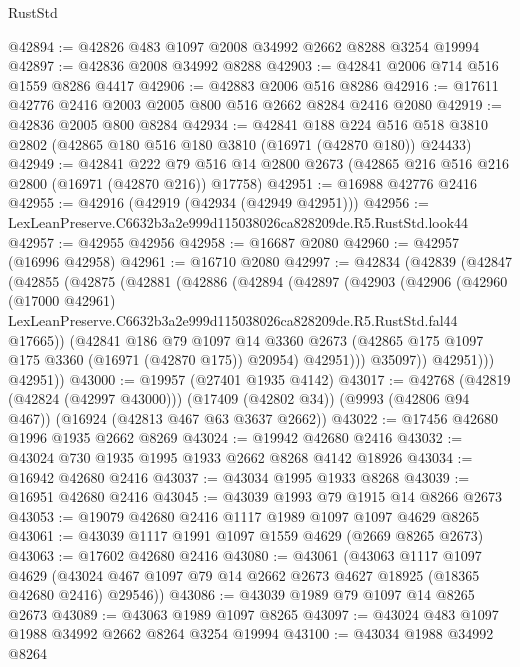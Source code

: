 \begin{lexlean}{RustStd}
\begin{coremodule}
@42894 := @42826 @483 @1097 @2008 @34992 @2662 @8288 @3254 @19994
@42897 := @42836 @2008 @34992 @8288
@42903 := @42841 @2006 @714 @516 @1559 @8286 @4417
@42906 := @42883 @2006 @516 @8286
@42916 := @17611 @42776 @2416 @2003 @2005 @800 @516 @2662 @8284 @2416 @2080
@42919 := @42836 @2005 @800 @8284
@42934 := @42841
    @188
    @224
    @516
    @518
    @3810
    @2802
    (@42865 @180 @516 @180 @3810 (@16971 (@42870 @180)) @24433)
@42949 := @42841
    @222
    @79
    @516
    @14
    @2800
    @2673
    (@42865 @216 @516 @216 @2800 (@16971 (@42870 @216)) @17758)
@42951 := @16988 @42776 @2416
@42955 := @42916 (@42919 (@42934 (@42949 @42951)))
@42956 := LexLeanPreserve.C6632b3a2e999d115038026ca828209de.R5.RustStd.look44
@42957 := @42955 @42956
@42958 := @16687 @2080
@42960 := @42957 (@16996 @42958)
@42961 := @16710 @2080
@42997 := @42834
    (@42839
      (@42847
        (@42855
          (@42875
            (@42881
              (@42886
                (@42894
                  (@42897
                    (@42903
                      (@42906
                        (@42960
                          (@17000 @42961)
                          LexLeanPreserve.C6632b3a2e999d115038026ca828209de.R5.RustStd.fal44
                          @17665))
                      (@42841
                        @186
                        @79
                        @1097
                        @14
                        @3360
                        @2673
                        (@42865 @175 @1097 @175 @3360 (@16971 (@42870 @175)) @20954)
                        @42951)))
                  @35097))
              @42951)))
        @42951))
@43000 := @19957 (@27401 @1935 @4142)
@43017 := @42768
    (@42819 (@42824 (@42997 @43000)))
    (@17409 (@42802 @34))
    (@9993 (@42806 @94 @467))
    (@16924 (@42813 @467 @63 @3637 @2662))
@43022 := @17456 @42680 @1996 @1935 @2662 @8269
@43024 := @19942 @42680 @2416
@43032 := @43024 @730 @1935 @1995 @1933 @2662 @8268 @4142 @18926
@43034 := @16942 @42680 @2416
@43037 := @43034 @1995 @1933 @8268
@43039 := @16951 @42680 @2416
@43045 := @43039 @1993 @79 @1915 @14 @8266 @2673
@43053 := @19079 @42680 @2416 @1117 @1989 @1097 @1097 @4629 @8265
@43061 := @43039 @1117 @1991 @1097 @1559 @4629 (@2669 @8265 @2673)
@43063 := @17602 @42680 @2416
@43080 := @43061
    (@43063
      @1117
      @1097
      @4629
      (@43024 @467 @1097 @79 @14 @2662 @2673 @4627 @18925 (@18365 @42680 @2416) @29546))
@43086 := @43039 @1989 @79 @1097 @14 @8265 @2673
@43089 := @43063 @1989 @1097 @8265
@43097 := @43024 @483 @1097 @1988 @34992 @2662 @8264 @3254 @19994
@43100 := @43034 @1988 @34992 @8264

\end{coremodule}
\end{lexlean}
